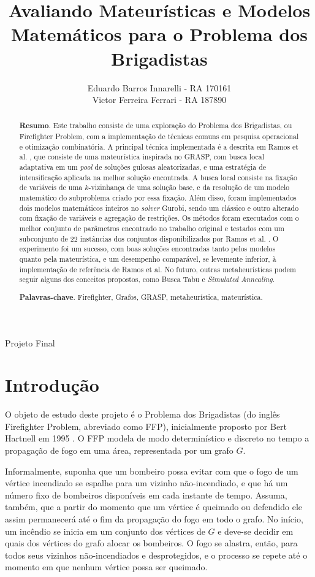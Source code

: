 \documentclass{MO824}
\title{Avaliando Mateurísticas e Modelos Matemáticos para o Problema dos Brigadistas}
\author{
    Eduardo Barros Innarelli - RA 170161\\
    Victor Ferreira Ferrari  - RA 187890\\
}
\begin{document}
\criartitulo

%
{Projeto Final}

\begin{abstract}
{\bf Resumo}. Este trabalho consiste de uma exploração do Problema dos Brigadistas, ou Firefighter Problem, com a implementação de técnicas comuns em pesquisa operacional e otimização combinatória. A principal técnica implementada é a descrita em Ramos et al. \cite{natanael,nat_dissertation}, que consiste de uma mateurística inspirada no GRASP, com busca local adaptativa em um \textit{pool} de soluções gulosas aleatorizadas, e uma estratégia de intensificação aplicada na melhor solução encontrada. A busca local consiste na fixação de variáveis de uma $k$-vizinhança de uma solução base, e da resolução de um modelo matemático do subproblema criado por essa fixação. Além disso, foram implementados dois modelos matemáticos inteiros no \textit{solver} Gurobi, sendo um clássico e outro alterado com fixação de variáveis e agregação de restrições. Os métodos foram executados com o melhor conjunto de parâmetros encontrado no trabalho original e testados com um subconjunto de 22 instâncias dos conjuntos disponibilizados por Ramos et al. \cite{ffp-instances-page}. O experimento foi um sucesso, com boas soluções encontradas tanto pelos modelos quanto pela mateurística, e um desempenho comparável, se levemente inferior, à implementação de referência de Ramos et al. No futuro, outras metaheurísticas podem seguir alguns dos conceitos propostos, como Busca Tabu e \textit{Simulated Annealing}.

{\bf Palavras-chave}. Firefighter, Grafos, GRASP, metaheurística, mateurística.

\end{abstract}

\section{Introdução}
    O objeto de estudo deste projeto é o Problema dos Brigadistas (do inglês Firefighter Problem, abreviado como FFP), inicialmente proposto por Bert Hartnell em 1995 \cite{original}. O FFP modela de modo determinístico e discreto no tempo a propagação de fogo em uma área, representada por um grafo $G$.
    
    Informalmente, suponha que um bombeiro possa evitar com que o fogo de um vértice incendiado se espalhe para um vizinho não-incendiado, e que há um número fixo de bombeiros disponíveis em cada instante de tempo. Assuma, também, que a partir do momento que um vértice é queimado ou defendido ele assim permanecerá até o fim da propagação do fogo em todo o grafo. No início, um incêndio se inicia em um conjunto dos vértices de $G$ e deve-se decidir em quais dos vértices do grafo alocar os bombeiros. O fogo se alastra, então, para todos seus vizinhos não-incendiados e desprotegidos, e o processo se repete até o momento em que nenhum vértice possa ser queimado.
    
\end{document}
